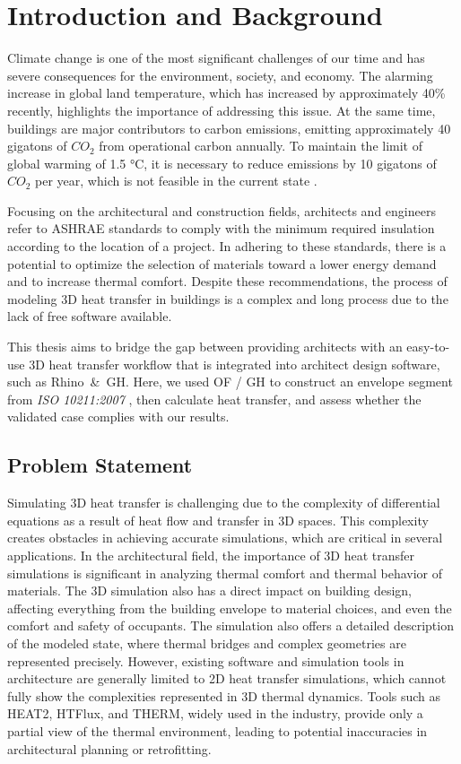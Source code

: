 \chapter{Introduction and Background}


Climate change is one of the most significant challenges of our time and has severe consequences for the environment, society, and economy. The alarming increase in global land temperature, which has increased by approximately 40\% \cite{glb} recently, highlights the importance of addressing this issue. At the same time, buildings are major contributors to carbon emissions, emitting approximately 40 gigatons of $CO_2$ from operational carbon annually. To maintain the limit of global warming of 1.5 °C, it is necessary to reduce emissions by 10 gigatons of $CO_2$ per year, which is not feasible in the current state \cite{ipcc}.



Focusing on the architectural and construction fields, architects and engineers refer to \gls{ASHRAE} standards to comply with the minimum required insulation according to the location of a project. 
In adhering to these standards, there is a potential to optimize the selection of materials toward a lower energy demand and to increase thermal comfort. Despite these recommendations, the process of modeling 3D heat transfer in buildings is a complex and long process due to the lack of free software available. 

This thesis aims to bridge the gap between providing architects with an easy-to-use 3D heat transfer workflow that is integrated into architect design software, such as Rhino\, \&\, \gls{GH}. Here, we used \gls{OF} / \gls{GH} to construct an envelope segment from \textit{ISO 10211:2007}
\cite{ISO}, then calculate heat transfer, and assess whether the validated case complies with our results. 



\section{Problem Statement}
Simulating 3D heat transfer is challenging due to the complexity of differential equations as a result of heat flow and transfer in 3D spaces. 
This complexity creates obstacles in achieving accurate simulations, which are critical in several applications. In the architectural field, the importance of 3D heat transfer simulations is significant in analyzing thermal comfort and thermal behavior of materials. The 3D simulation also has a direct impact on building design, affecting everything from the building envelope to material choices, and even the comfort and safety of occupants. The simulation also offers a detailed description of the modeled state, where thermal bridges and complex geometries are represented precisely.
However, existing software and simulation tools in architecture are generally limited to 2D heat transfer simulations, which cannot fully show the complexities represented in 3D thermal dynamics. Tools such as HEAT2, HTFlux, and THERM, widely used in the industry, provide only a partial view of the thermal environment, leading to potential inaccuracies in architectural planning or retrofitting.

